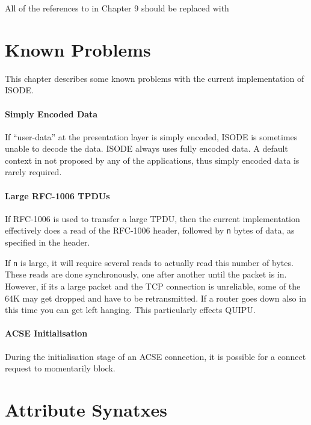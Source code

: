 All of the references to  in Chapter 9 should be replaced
with 

\chapter{Known Problems}

This chapter describes some known problems with the current
implementation of ISODE.

\subsubsection{Simply Encoded Data}

If ``user-data'' at the presentation layer is simply encoded, ISODE is
sometimes unable to decode the data.  ISODE always uses fully encoded
data.  A default context in not proposed by any of the applications,
thus simply encoded data is rarely required.

\subsubsection{Large RFC-1006 TPDUs}

If RFC-1006 is used to transfer a large TPDU, then the current
implementation effectively does a read of the RFC-1006 header,
followed by \verb+n+ bytes of data, as specified in the header.

If \verb+n+ is large, it will require several reads to 
actually read this number of bytes. These reads are done
synchronously, one after another until the packet is in. However, if
its a large packet and the TCP connection is unreliable, some of the 64K
may get dropped and have to be retransmitted.
If a router goes down also in this time you can get left hanging.
This particularly effects QUIPU.

\subsubsection{ACSE Initialisation}

During the initialisation stage of an ACSE connection, it is possible
for a connect request to momentarily block.


\appendix





\chapter{Attribute Synatxes}

